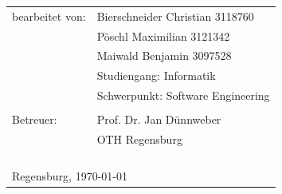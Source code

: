 \begin{small}
\begin{tabular}{ll}
bearbeitet von:\hspace{1cm} & Bierschneider Christian \hspace{0.5cm}3118760 \tabularnewline
 & Pöschl Maximilian \hspace{1.1cm}3121342 \tabularnewline
 & Maiwald Benjamin \hspace{1.25cm}3097528 \tabularnewline
 & Studiengang: Informatik \tabularnewline
 & Schwerpunkt: Software Engineering \tabularnewline
 & \tabularnewline

 
Betreuer: & Prof. Dr. Jan Dünnweber \tabularnewline
 & OTH Regensburg\tabularnewline
 & \tabularnewline
 & \tabularnewline
 & \tabularnewline
  & \tabularnewline
\multicolumn{2}{l}{Regensburg, \today}\tabularnewline
\end{tabular}
\end{small}
